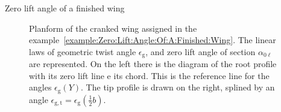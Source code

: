 \documentclass[[12pt,twoside]{book}
\begin{document}
\begin{myExampleX}{Zero lift angle of a finished wing}{}
\begin{figure}[t]
  \caption{
    Planform of the cranked wing
 assigned in the example~\ref{example:Zero:Lift:Angle:Of:A:Finished:Wing}.
    The linear laws of geometric twist angle $\epsilon_\mathrm{g}$, and zero lift angle of section $\alpha_{0\ell}$ are represented.
   On the left there is the diagram of the root profile with its zero lift line e its chord. This is the reference line for the angles $\epsilon_\mathrm{g}(Y)$. 
    The tip profile is drawn on the right, splined by an angle
    $\epsilon_{\mathrm{g,t}}=\epsilon_\mathrm{g}(\frac{1}{2}b)$.%
    }
  \label{fig:Zero:Lift:Basic:1}%
\end{figure}
%
\end{myExampleX}
\end{document}
